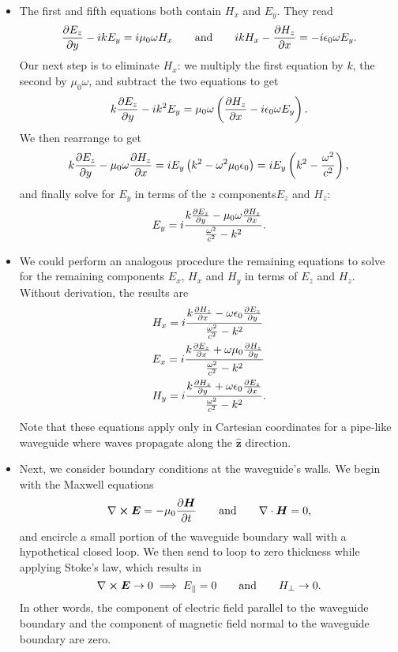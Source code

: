 \documentclass[11pt, a4paper]{article}
\newcommand{\eqtext}[1]{\qquad \text{#1} \qquad}
\renewcommand{\vec}[1]{\bm{#1}} %
\newcommand{\uvec}[1]{\hat{\vec{#1}}} %
\newcommand{\E}{\vec{E}}  %
\renewcommand{\H}{\vec{H}}  %
\newcommand{\ee}{\epsilon_{0}}  %
\newcommand{\mm}{\mu_{0}}  %
\newcommand{\m}{\vec{m}}  %
\renewcommand{\div}{\nabla \cdot}
\renewcommand{\curl}{\nabla \cross}
\begin{document}
\begin{itemize}
	\item The first and fifth equations both contain $ H_{x} $ and $ E_{y} $. They read
	\begin{equation*}
		\pdv{E_{z}}{y} - ikE_{y} = i \mm \omega H_{x} \eqtext{and} ikH_{x}  - \pdv{H_{z}}{x}   = -i\ee \omega E_{y}.
	\end{equation*}
	Our next step is to eliminate $ H_{x} $: we multiply the first equation by $ k $, the second by $ \mm \omega $, and subtract the two equations to get
	\begin{equation*}
		k \pdv{E_{z}}{y} - i k^{2}E_{y}= \mm \omega \left(\pdv{H_{z}}{x} - i \ee \omega E_{y}\right).
	\end{equation*}
	We then rearrange to get
	\begin{equation*}
		k \pdv{E_{z}}{y} - \mm \omega \pdv{H_{z}}{x} = iE_{y}\left(k^{2} - \omega^{2}\mm \ee\right) =  iE_{y}\left(k^{2} - \frac{\omega^{2}}{c^{2}}\right),
	\end{equation*}
	and finally solve for $ E_{y} $ in terms of the $ z $ components$ E_{z} $ and $ H_{z} $:
	\begin{equation*}
		E_{y} = i \frac{k \pdv{E_{z}}{y} - \mm \omega \pdv{H_{z}}{x}}{\frac{\omega^{2}}{c^{2}} - k^{2}}.
	\end{equation*}
	
	\item We could perform an analogous procedure the remaining equations to solve for the remaining components $ E_{x} $, $ H_{x} $ and $ H_{y} $ in terms of $ E_{z} $ and $ H_{z} $. Without derivation, the results are
	\begin{align*}
		&H_{x} = i \frac{k\pdv{H_{z}}{x} - \omega \ee \pdv{E_{z}}{y}}{\frac{\omega^{2}}{c^{2}} - k^{2}}\\
		&E_{x} = i \frac{k \pdv{E_{z}}{x} + \omega \mm \pdv{H_{z}}{y}}{\frac{\omega^{2}}{c^{2}} - k^{2}}\\
		&H_{y} = i \frac{k\pdv{H_{z}}{y} + \omega \ee \pdv{E_{z}}{x}}{\frac{\omega^{2}}{c^{2}} - k^{2}}.
	\end{align*}
	Note that these equations apply only in Cartesian coordinates for a pipe-like waveguide where waves propagate along the $ \uvec{z} $ direction.
	
	
	\item Next, we consider boundary conditions at the waveguide's walls. We begin with the Maxwell equations
	\begin{equation*}
		\curl \E = - \mm \pdv{\H}{t} \eqtext{and} \div \H = 0,
	\end{equation*}
	and encircle a small portion of the waveguide boundary wall with a hypothetical closed loop. We then send to loop to zero thickness while applying Stoke's law, which results in 
	\begin{equation*}
		\curl \E \to 0 \implies E_{\parallel} = 0 \eqtext{and} H_{\perp} \to 0.
	\end{equation*}
	In other words, the component of electric field parallel to the waveguide boundary and the component of magnetic field normal to the waveguide boundary are zero.
	

\end{itemize}
\end{document}
